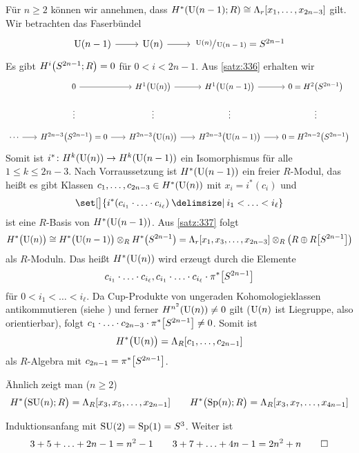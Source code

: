 \begin{beweis}
	Für $n \ge 2$ können wir annehmen, dass $H^* \enbrace*{\Un(n-1);R} \cong \Lambda_r \benbrace*{x_1, \ldots , x_{2n-3}}$ gilt.
	Wir betrachten das Faserbündel
	\[
		\begin{tikzcd}
			\Un(n-1) \rar & \Un(n) \rar & \sfrac{\Un(n)}{\Un(n-1)} = S^{2n-1}
		\end{tikzcd}
	\]
	Es gibt $H^i \enbrace*{S^{2n-1};R} = 0$ für $0 < i < 2n-1$.
	Aus \autoref{satz:336} erhalten wir 
	\[
		\begin{tikzcd}[column sep=1.8em,row sep=1em]
			& 0 \rar & H^1 \enbrace[\big]{\Un(n)} \rar & H^1 \enbrace[\big]{\Un(n-1)} \rar & 0 = H^2\enbrace*{S^{2n-1}}  \\
			&\vdots & \vdots & \vdots & \vdots \\
			\cdots \rar & H^{2n-3}\enbrace*{S^{2n-1}} = 0  \rar & H^{2n-3} \enbrace[\big]{\Un(n)} \rar & H^{2n-3} \enbrace[\big]{\Un(n-1)} \rar & 0 = H^{2n-2} \enbrace*{S^{2n-1}}
		\end{tikzcd}
	\]
	Somit ist $i^* \colon H^k \enbrace*{\Un(n)} \to H^k \enbrace*{\Un(n-1)}$ ein Isomorphismus für alle $1\le k \le 2n-3$.
	Nach Vorraussetzung ist $H^* \enbrace*{\Un(n-1)}$ ein freier $R$-Modul, das heißt es gibt Klassen $c_1, \ldots ,c_{2n-3} \in H^*(\operatorname{U}(n))$ mit $x_i = i^*(c_i)$ und 
	\[
		\set[\big]{i^* \enbrace*{c_{i_1} \cdot \ldots \cdot  c_{i_\ell}} \given i_1 < \ldots < i_\ell}
	\]
	ist eine $R$-Basis von $H^* \enbrace*{\Un(n-1)}$.
	Aus \autoref{satz:337} folgt
	\[
		H^* \enbrace[\big]{\Un(n)} \cong H^* \enbrace[\big]{\Un(n-1)} \otimes_R H^* \enbrace*{S^{2n-1}} = \Lambda_r \benbrace*{x_1, x_3, \ldots ,x_{2n-3}} \otimes_R \enbrace*{R \oplus R \benbrace*{S^{2n-1}}}
	\]
	als $R$-Moduln.
	Das heißt $H^* \enbrace*{\Un(n)}$ wird erzeugt durch die Elemente 
	\[
		c_{i_1} \cdot \ldots \cdot c_{i_\ell} , c_{i_1} \cdot \ldots \cdot c_{i_\ell} \cdot \pi^* \benbrace*{S^{2n-1}}
	\]
	für $0 < i_1 < \ldots < i_\ell$.
	Da Cup-Produkte von ungeraden Kohomologieklassen antikommutieren (siehe \textcite[Thm.~3.11]{Hatcher}) und ferner $H^{n^2}(\operatorname{U}(n)) \neq 0$ gilt ($\operatorname{U}(n)$ ist Liegruppe, also orientierbar), folgt $c_1 \cdot \ldots \cdot c_{2n-3} \cdot \pi^* \benbrace*{S^{2n-1}} \neq 0$.
	Somit ist 
	\[
		H^* \enbrace[\big]{\Un(n)} = \Lambda_R \benbrace*{c_1, \ldots , c_{2n-1}}
	\]
	als $R$-Algebra mit $c_{2n-1} = \pi^*\benbrace*{S^{2n-1}}$.
\end{beweis}

\begin{bemerkung*}[{name=[Kohomologie der speziellen unitären Gruppe]}]
	Ähnlich zeigt man ($n \ge 2$)
	\[
		H^* \enbrace[\big]{\SU(n);R} = \Lambda_R\benbrace*{x_3, x_5, \ldots , x_{2n-1}} \qquad H^* \enbrace[\big]{\Sp(n);R} = \Lambda_R \benbrace*{x_3, x_7, \ldots , x_{4n-1}}
	\]
\end{bemerkung*}
\begin{beweis}[name={Skizze}]
	Induktionsanfang mit $\operatorname{SU}(2) = \operatorname{Sp}(1) = S^3$. Weiter ist 
	\[
		3+5+ \ldots + 2n - 1 = n^2 -1 \qquad 3+7+ \ldots + 4n-1 = 2n^2 +n \qedhere
	\]
\end{beweis}

